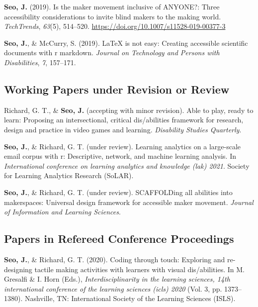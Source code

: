 \documentclass[11pt, a4paper]{awesome-cv}
\begin{document}
\hypertarget{refs_journals}{}
\leavevmode\hypertarget{ref-seo2019maker}{}%
\textbf{Seo, J.} (2019). Is the maker movement inclusive of ANYONE?:
Three accessibility considerations to invite blind makers to the making
world. \emph{TechTrends}, \emph{63}(5), 514--520.
\url{https://doi.org/10.1007/s11528-019-00377-3}

\leavevmode\hypertarget{ref-seo2019arow}{}%
\textbf{Seo, J.}, \& McCurry, S. (2019). LaTeX is not easy: Creating
accessible scientific documents with r markdown. \emph{Journal on
Technology and Persons with Disabilities}, \emph{7}, 157--171.

\hypertarget{working-papers-under-revision-or-review}{%
\subsection{Working Papers under Revision or
Review}\label{working-papers-under-revision-or-review}}

\hypertarget{refs_working_paper}{}
\leavevmode\hypertarget{ref-dsq}{}%
Richard, G. T., \& \textbf{Seo, J.} (accepting with minor revision).
Able to play, ready to learn: Proposing an intersectional, critical
dis/abilities framework for research, design and practice in video games
and learning. \emph{Disability Studies Quarterly}.

\leavevmode\hypertarget{ref-seo2021mboxr}{}%
\textbf{Seo, J.}, \& Richard, G. T. (under review). Learning analytics
on a large-scale email corpus with r: Descriptive, network, and machine
learning analysis. In \emph{International conference on learning
analytics and knowledge (lak) 2021}. Society for Learning Analytics
Research (SoLAR).

\leavevmode\hypertarget{ref-scaffold}{}%
\textbf{Seo, J.}, \& Richard, G. T. (under review). SCAFFOLDing all
abilities into makerspaces: Universal design framework for accessible
maker movement. \emph{Journal of Information and Learning Sciences}.

\hypertarget{papers-in-refereed-conference-proceedings}{%
\subsection{Papers in Refereed Conference
Proceedings}\label{papers-in-refereed-conference-proceedings}}

\hypertarget{refs_proceedings}{}
\leavevmode\hypertarget{ref-seo2020coding}{}%
\textbf{Seo, J.}, \& Richard, G. T. (2020). Coding through touch:
Exploring and re-designing tactile making activities with learners with
visual dis/abilities. In M. Gresalfi \& I. Horn (Eds.),
\emph{Interdisciplinarity in the learning sciences, 14th international
conference of the learning sciences (icls) 2020} (Vol. 3, pp.
1373--1380). Nashville, TN: International Society of the Learning
Sciences (ISLS).
\end{document}
